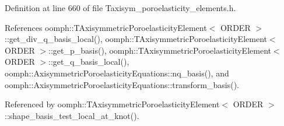 Definition at line 660 of file Taxisym\+\_\+poroelasticity\+\_\+elements.\+h.



References oomph\+::\+T\+Axisymmetric\+Poroelasticity\+Element$<$ O\+R\+D\+E\+R $>$\+::get\+\_\+div\+\_\+q\+\_\+basis\+\_\+local(), oomph\+::\+T\+Axisymmetric\+Poroelasticity\+Element$<$ O\+R\+D\+E\+R $>$\+::get\+\_\+p\+\_\+basis(), oomph\+::\+T\+Axisymmetric\+Poroelasticity\+Element$<$ O\+R\+D\+E\+R $>$\+::get\+\_\+q\+\_\+basis\+\_\+local(), oomph\+::\+Axisymmetric\+Poroelasticity\+Equations\+::nq\+\_\+basis(), and oomph\+::\+Axisymmetric\+Poroelasticity\+Equations\+::transform\+\_\+basis().



Referenced by oomph\+::\+T\+Axisymmetric\+Poroelasticity\+Element$<$ O\+R\+D\+E\+R $>$\+::shape\+\_\+basis\+\_\+test\+\_\+local\+\_\+at\+\_\+knot().

\mbox{\label{classoomph_1_1TAxisymmetricPoroelasticityElement_acc7a872515a68044fd5f379ca683cab1}} 
